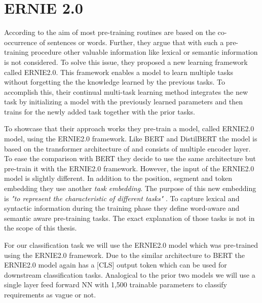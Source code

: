 \section{ERNIE 2.0}
\label{chp:approach:sec:ernie2.0}

According to \textcite{Sun:2019a} the aim of most pre-training routines are based on the co-occurrence of sentences or words.
Further, they argue that with such a pre-training procedure other valuable information like lexical or semantic information is not considered.
To solve this issue, they proposed a new learning framework called \ac{ERNIE2.0}.
This framework enables a model to learn multiple tasks without forgetting the the knowledge learned by the previous tasks.
To accomplish this, their continual multi-task learning method integrates the new task by initializing a model with the previously learned parameters and then trains for the newly added task together with the prior tasks.

To showcase that their approach works they pre-train a model, called \ac{ERNIE2.0} model, using the \ac{ERNIE2.0} framework.
Like \ac{BERT} and \ac{DistilBERT} the model is based on the transformer architecture of \textcite{Vaswani:2017} and consists of multiple encoder layer.
To ease the comparison with \ac{BERT} they decide to use the same architecture but pre-train it with the \ac{ERNIE2.0} framework.
However, the input of the \ac{ERNIE2.0} model is slightly different.
In addition to the position, segment and token embedding they use another \textit{task embedding}.
The purpose of this new embedding is \textit{"to represent the characteristic of different tasks"} \parencite{Sun:2019a}.
To capture lexical and syntactic information during the training phase they define word-aware and semantic aware pre-training tasks.
The exact explanation of those tasks is not in the scope of this thesis. \parencite{Sun:2019a}

For our classification task we will use the \ac{ERNIE2.0} model which was pre-trained using the \ac{ERNIE2.0} framework.
Due to the similar architecture to \ac{BERT} the \ac{ERNIE2.0} model again has a [CLS] output token which can be used for downstream classification tasks.
Analogical to the prior two models we will use a single layer feed forward \ac{NN} with 1,500 trainable parameters to classify requirements as vague or not.
